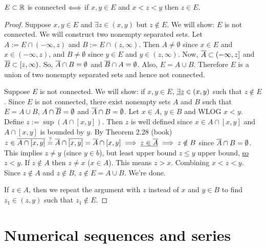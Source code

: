 \documentclass[]{article}
\begin{document}
\begin{theorem}
	$E\subset\mathbb{R}$ is connected $\Longleftrightarrow$ if $x,y\in E$ and $x<z<y$ then $z\in E$.
\end{theorem}
\begin{proof}
	\say{$\implies$} Suppose $x,y\in E$ and $\exists z\in (x,y)$ but $z\notin E$.
	We will show: $E$ is not connected. We will construct two nonempty separated sets.
	Let $A:= E\cap (-\infty,z)$ and $B:= E\cap(z,\infty)$.
	Then $A\neq\emptyset$ since $x\in E$ and $x\in(-\infty,z)$, and $B\neq\emptyset$ since $y\in E$ and $y\in(z,\infty)$.
	Now, $\overline{A} \subset (-\infty,z]$ and $\overline{B}\subset[z,\infty)$.
	So, $\overline{A}\cap B=\emptyset$ and $\overline{B}\cap A = \emptyset$.
	Also, $E = A\cup B$.
	Therefore $E$ is a union of two nonempty separated sets and hence not connected.

	\say{$\Lla$} Suppose $E$ is not connected. We will show: if $x,y\in E$, $\underline{\exists z}\in(x,y)$ such that $z\notin E$.
	Since $E$ is not connected, there exist nonempty sets $A$ and $B$ such that $E = A\cup B$, $A\cap\overline{B}=\emptyset$ and $\overline{A}\cap B = \emptyset$.
	Let $x\in A$, $y\in B$ and WLOG $x<y$.
	Define $z:= \sup(A\cap [x,y])$.
	Then $z$ is well defined since $x\in A\cap[x,y]$ and $A\cap[x,y]$ is bounded by $y$.
	By Theorem 2.28 (book) $z\in \overline{A\cap[x,y]}\overset{?}{=} \overline{A}\cap\overline{[x,y]} = \overline{A}\cap [x,y] \implies \underline{z\in \overline{A}} \implies z\notin B$ since $\overline{A}\cap B = \emptyset$. This implies $z\neq y$ (since $y\in b$), but least upper bound $z\leq y$ upper bound, \ul{so $z<y$}.
	If $z\notin A$ then $z\neq x$ ($x\in A$). This means \ul{$z>x$}. Combining $x<z<y$.
	Since $z\notin A$ and $z\notin B$, $z\notin E = A\cup B$. We're done.

	If \ul{$z\in A$}, then we repeat the argument with $z$ instead of $x$ and $y\in B$ to find $z_1\in (z,y)$ such that $z_1\notin E$.
\end{proof}

\section{Numerical sequences and series}
\end{document}
